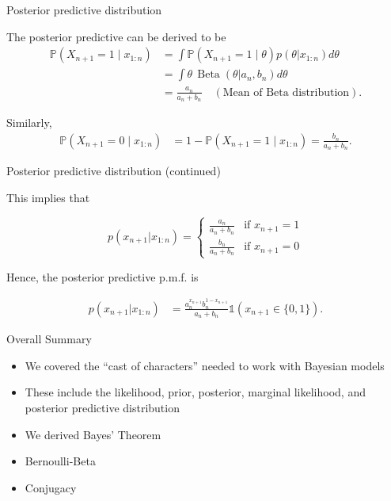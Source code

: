 \documentclass[
  ignorenonframetext,
]{beamer}
\providecommand{\tightlist}{%
  \setlength{\itemsep}{0pt}\setlength{\parskip}{0pt}}
\DeclareMathOperator*{\Beta}{Beta}
\renewcommand{\Pr}{\mathbb{P}}
\newcommand{\I}{\mathds{1}}
\begin{document}
\begin{frame}{Posterior predictive distribution}
\protect\hypertarget{posterior-predictive-distribution-2}{}

The posterior predictive can be derived to be \[
\begin{aligned}
\Pr(X_{n+1} = 1\mid x_{1:n}) 
&= \int \Pr(X_{n+1} = 1\mid \theta) p(\theta|x_{1:n}) d\theta\\
& =\int \theta\,\Beta(\theta|a_n,b_n) d\theta \\
& =\frac{a_n}{a_n + b_n}  \quad (\text{Mean of Beta distribution}).
\end{aligned}
\]

Similarly, \[
\begin{aligned}
\Pr(X_{n+1} = 0 \mid x_{1:n}) & = 1- \Pr(X_{n+1} = 1 \mid x_{1:n}) = \frac{b_n}{a_n + b_n}.
\end{aligned}
\]

\end{frame}

\begin{frame}{Posterior predictive distribution (continued)}
\protect\hypertarget{posterior-predictive-distribution-continued}{}

This implies that

\[p(x_{n+1}|x_{1:n}) =
\begin{cases} 
 \frac{a_n}{a_n + b_n} & \mbox{if } x_{n+1} = 1  \\
\frac{b_n}{a_n + b_n} & \mbox{if } x_{n+1} = 0
\end{cases}
\]

Hence, the posterior predictive p.m.f. is

\[
\begin{aligned}
p(x_{n+1}|x_{1:n}) & = \frac{a_n^{x_{n+1}} b_n^{1-x_{n+1}}}{a_n + b_n}\I(x_{n+1}\in\{0,1\}).
\end{aligned}
\]

\end{frame}

\begin{frame}{Overall Summary}
\protect\hypertarget{overall-summary}{}

\begin{itemize}
\tightlist
\item
  We covered the ``cast of characters'' needed to work with Bayesian
  models
\item
  These include the likelihood, prior, posterior, marginal likelihood,
  and posterior predictive distribution
\item
  We derived Bayes' Theorem
\item
  Bernoulli-Beta
\item
  Conjugacy
\end{itemize}

\end{frame}
\end{document}
